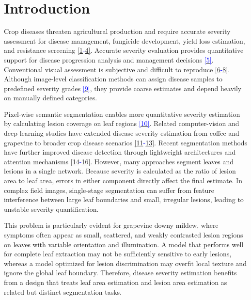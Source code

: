 \documentclass[
]{article}
\begin{document}
\hypertarget{introduction}{%
\section{Introduction}\label{introduction}}

Crop diseases threaten agricultural production and require accurate
severity assessment for disease management, fungicide development, yield
loss estimation, and resistance screening \textcolor{blue}{\hyperlink{ref:1}{[1}-\hyperlink{ref:4}{4]}}.
Accurate severity evaluation provides quantitative support for disease
progression analysis and management decisions \hyperlink{ref:5}{\textcolor{blue}{[5]}}. Conventional visual
assessment is subjective and difficult to reproduce \textcolor{blue}{\hyperlink{ref:6}{[6}-\hyperlink{ref:8}{8]}}. Although
image-level classification methods can assign disease samples to
predefined severity grades \hyperlink{ref:9}{\textcolor{blue}{[9]}}, they provide coarse estimates and
depend heavily on manually defined categories.

Pixel-wise semantic segmentation enables more quantitative severity
estimation by calculating lesion coverage on leaf regions \hyperlink{ref:10}{\textcolor{blue}{[10]}}.
Related computer-vision and deep-learning studies have extended disease
severity estimation from coffee and grapevine to broader crop disease
scenarios \textcolor{blue}{\hyperlink{ref:11}{[11}-\hyperlink{ref:13}{13]}}. Recent segmentation
methods have further improved disease detection through lightweight
architectures and attention mechanisms \textcolor{blue}{\hyperlink{ref:14}{[14}-\hyperlink{ref:16}{16]}}.
However, many approaches segment leaves and lesions in a single network.
Because severity is calculated as the ratio of lesion area to leaf area,
errors in either component directly affect the final estimate. In complex
field images, single-stage segmentation can suffer from feature
interference between large leaf boundaries and small, irregular lesions,
leading to unstable severity quantification.

This problem is particularly evident for grapevine downy mildew, where
symptoms often appear as small, scattered, and weakly contrasted lesion
regions on leaves with variable orientation and illumination. A model
that performs well for complete leaf extraction may not be sufficiently
sensitive to early lesions, whereas a model optimized for lesion
discrimination may overfit local texture and ignore the global leaf
boundary. Therefore, disease severity estimation benefits from a design
that treats leaf area estimation and lesion area estimation as related
but distinct segmentation tasks.
\end{document}
